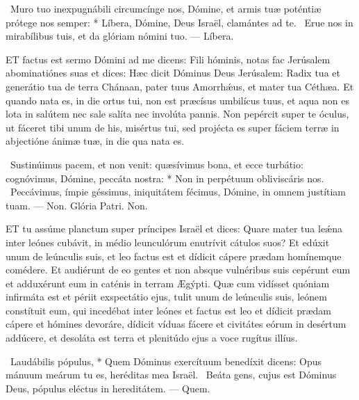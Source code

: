 \R\ Muro tuo inexpugnábili circumcínge nos, Dómine, et armis tuæ poténtiæ prótege nos semper: * Líbera, Dómine, Deus Israël, clamántes ad te. \V\ Erue nos in mirabílibus tuis, et da glóriam nómini tuo. — Líbera.



\lettrine[lines=2]{E}{T} factus est sermo Dómini ad me dicens: Fili hóminis, notas fac Jerúsalem abominatiónes suas et dices: Hæc dicit Dóminus Deus Jerúsalem: Radix tua et generátio tua de terra Chánaan, pater tuus Amorrhǽus, et mater tua Céthæa. Et quando nata es, in die ortus tui, non est præcísus umbilícus tuus, et aqua non es lota in salútem nec sale salíta nec involúta pannis. Non pepércit super te óculus, ut fáceret tibi unum de his, misértus tui, sed projécta es super fáciem terræ in abjectióne ánimæ tuæ, in die qua nata es.

\R\ Sustinúimus pacem, et non venit: quæsívimus bona, et ecce turbátio: cognóvimus, Dómine, peccáta nostra: * Non in perpétuum obliviscáris nos. \V\ Peccávimus, ímpie géssimus, iniquitátem fécimus, Dómine, in omnem justítiam tuam. — Non. Glória Patri. Non.




\lettrine[lines=2]{E}{T} tu assúme planctum super príncipes Israël et dices: Quare mater tua leǽna inter leónes cubávit, in médio leunculórum enutrívit cátulos suos? Et edúxit unum de leúnculis suis, et leo factus est et dídicit cápere prædam homínemque comédere. Et audiérunt de eo gentes et non absque vulnéribus suis cepérunt eum et adduxérunt eum in caténis in terram Ægýpti. Quæ cum vidísset quóniam infirmáta est et périit exspectátio ejus, tulit unum de leúnculis suis, leónem constítuit eum, qui incedébat inter leónes et factus est leo et dídicit prædam cápere et hómines devoráre, dídicit víduas fácere et civitátes eórum in desértum addúcere, et desoláta est terra et plenitúdo ejus a voce rugítus illíus.

\R\ Laudábilis pópulus, * Quem Dóminus exercítuum benedíxit dicens: Opus mánuum meárum tu es, heréditas mea Israël. \V\ Beáta gens, cujus est Dóminus Deus, pópulus eléctus in hereditátem. — Quem.


